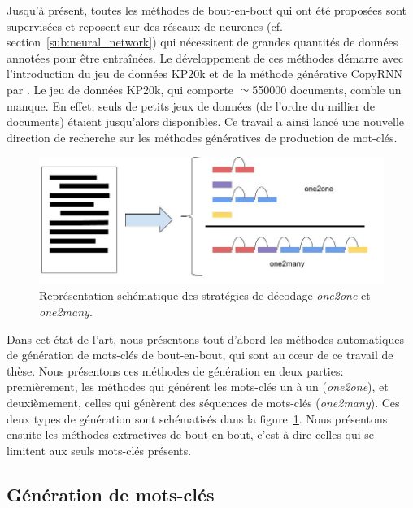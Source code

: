 Jusqu'à présent, toutes les méthodes de bout-en-bout qui ont été proposées sont supervisées et reposent sur des réseaux de neurones (cf. section~\ref{sub:neural_network}) qui nécessitent de grandes quantités de données annotées pour être entraînées.
%
Le développement de ces méthodes démarre avec l'introduction du jeu de données KP20k et de la méthode générative CopyRNN par \citet{meng_deep_2017}.
Le jeu de données KP20k, qui comporte $\simeq$\num{550000} documents, comble un manque.
En effet, seuls de petits jeux de données (de l'ordre du millier de documents) étaient jusqu'alors disponibles.
Ce travail a ainsi lancé une nouvelle direction de recherche sur les méthodes génératives de production de mot-clés.

\begin{figure}
    \centering
    \includegraphics[scale=0.4]{2_production_mots_cles/Decoding strategies.jpg}
    \caption{Représentation schématique des stratégies de décodage \emph{one2one} et \emph{one2many}.}
    \label{fig:decoding_strategies}
\end{figure}

Dans cet état de l'art, nous présentons tout d'abord les méthodes automatiques de génération de mots-clés de bout-en-bout, qui sont au c\oe{}ur de ce travail de thèse.
Nous présentons ces méthodes de génération en deux parties: premièrement, les méthodes qui générent les mots-clés un à un (\emph{one2one}), et deuxièmement, celles qui génèrent des séquences de mots-clés (\emph{one2many}). Ces deux types de génération sont schématisés dans la figure~\ref{fig:decoding_strategies}.
Nous présentons ensuite les méthodes extractives de bout-en-bout, c'est-à-dire celles qui se limitent aux seuls mots-clés présents.

\subsection{Génération de mots-clés}
\label{sub:generation_de_mots_cles}

